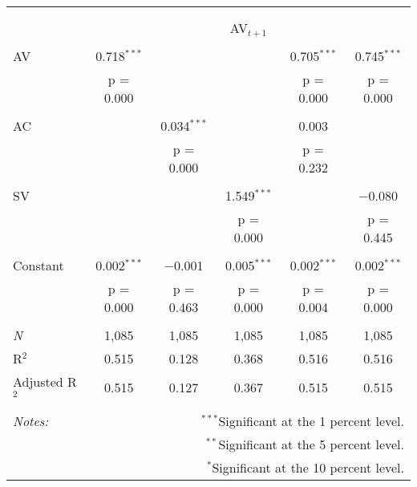 
\begin{tabular}{@{\extracolsep{5pt}}lccccc} 
\\[-1.8ex]\hline 
\hline \\[-1.8ex] 
\\[-1.8ex] & \multicolumn{5}{c}{AV$_{t+1}$} \\ 
\hline \\[-1.8ex] 
 AV & 0.718$^{***}$ &  &  & 0.705$^{***}$ & 0.745$^{***}$ \\ 
  & p = 0.000 &  &  & p = 0.000 & p = 0.000 \\ 
  & & & & & \\ 
 AC &  & 0.034$^{***}$ &  & 0.003 &  \\ 
  &  & p = 0.000 &  & p = 0.232 &  \\ 
  & & & & & \\ 
 SV &  &  & 1.549$^{***}$ &  & $-$0.080 \\ 
  &  &  & p = 0.000 &  & p = 0.445 \\ 
  & & & & & \\ 
 Constant & 0.002$^{***}$ & $-$0.001 & 0.005$^{***}$ & 0.002$^{***}$ & 0.002$^{***}$ \\ 
  & p = 0.000 & p = 0.463 & p = 0.000 & p = 0.004 & p = 0.000 \\ 
  & & & & & \\ 
\textit{N} & 1,085 & 1,085 & 1,085 & 1,085 & 1,085 \\ 
R$^{2}$ & 0.515 & 0.128 & 0.368 & 0.516 & 0.516 \\ 
Adjusted R$^{2}$ & 0.515 & 0.127 & 0.367 & 0.515 & 0.515 \\ 
\hline 
\hline \\[-1.8ex] 
\textit{Notes:} & \multicolumn{5}{r}{$^{***}$Significant at the 1 percent level.} \\ 
 & \multicolumn{5}{r}{$^{**}$Significant at the 5 percent level.} \\ 
 & \multicolumn{5}{r}{$^{*}$Significant at the 10 percent level.} \\ 
\end{tabular} 
